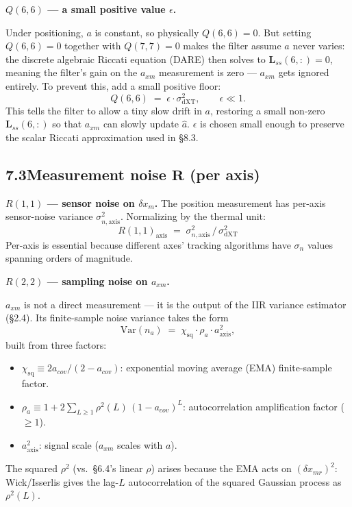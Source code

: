 \documentclass[11pt]{article}
\begin{document}
\bigskip
\noindent\textbf{$Q(6,6)$ --- a small positive value $\epsilon$.}

\smallskip
\noindent Under positioning, $a$ is constant, so physically $Q(6,6) = 0$. But setting $Q(6,6) = 0$ together with $Q(7,7) = 0$ makes the filter assume $a$ never varies: the discrete algebraic Riccati equation (DARE) then solves to $\bm{L}_{ss}(6,:) = 0$, meaning the filter's gain on the $a_{xm}$ measurement is zero --- $a_{xm}$ gets ignored entirely. To prevent this, add a small positive floor:
\begin{equation}
Q(6,6) \;=\; \epsilon \cdot \sigma^2_\mathrm{dXT}, \qquad \epsilon \ll 1.
\end{equation}
This tells the filter to allow a tiny slow drift in $a$, restoring a small non-zero $\bm{L}_{ss}(6,:)$ so that $a_{xm}$ can slowly update $\hat a$. $\epsilon$ is chosen small enough to preserve the scalar Riccati approximation used in \S8.3.

\subsection*{7.3\quad Measurement noise $\bm{R}$ (per axis)}

\noindent\textbf{$R(1,1)$ --- sensor noise on $\delta x_m$.} The position measurement has per-axis sensor-noise variance $\sigma^2_{n,\mathrm{axis}}$. Normalizing by the thermal unit:
\begin{equation}
\boxed{\;R(1,1)_\mathrm{axis} \;=\; \sigma^2_{n,\mathrm{axis}} \,/\, \sigma^2_\mathrm{dXT}\;}
\end{equation}
Per-axis is essential because different axes' tracking algorithms have $\sigma_n$ values spanning orders of magnitude.

\noindent\textbf{$R(2,2)$ --- sampling noise on $a_{xm}$.}

\smallskip
\noindent $a_{xm}$ is not a direct measurement --- it is the output of the IIR variance estimator (\S2.4). Its finite-sample noise variance takes the form
\begin{equation}
\mathrm{Var}(n_a) \;=\; \chi_\mathrm{sq} \cdot \rho_a \cdot a_\mathrm{axis}^2,
\end{equation}
built from three factors:
\begin{itemize}
\item $\chi_\mathrm{sq} \equiv 2 a_{cov} / (2 - a_{cov})$: exponential moving average (EMA) finite-sample factor.
\item $\rho_a \equiv 1 + 2 \sum_{L \geq 1} \rho^2(L)\,(1-a_{cov})^L$: autocorrelation amplification factor ($\geq 1$).
\item $a_\mathrm{axis}^2$: signal scale ($a_{xm}$ scales with $a$).
\end{itemize}
The squared $\rho^2$ (vs.\ \S6.4's linear $\rho$) arises because the EMA acts on $(\delta x_{mr})^2$: Wick/Isserlis gives the lag-$L$ autocorrelation of the squared Gaussian process as $\rho^2(L)$.
\end{document}
